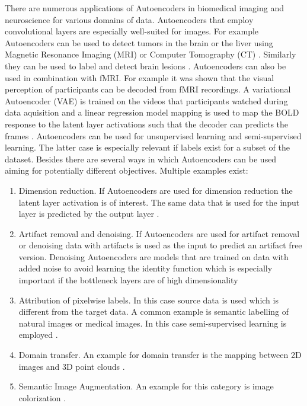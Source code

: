  There are numerous applications of Autoencoders in biomedical imaging and neuroscience for various domains of data. Autoencoders that employ convolutional layers are especially well-suited for images. For example Autoencoders can be used to detect tumors in the brain or the liver using Magnetic Resonance Imaging (MRI) or Computer Tomography (CT) \parencite{mallick2019brain, sital20203d}. Similarly they can be used to label and detect brain lesions \parencite{alex2017semisupervised}. Autoencoders can also be used in combination with fMRI. For example it was shown that the visual perception of participants can be decoded from fMRI recordings. A variational Autoencoder (VAE) is trained on the videos that participants watched during data aquisition and a linear regression model mapping is used to map the BOLD response to the latent layer activations such that the decoder can predicts the frames \parencite{han2019variational}. Autoencoders can be used for unsupervised learning and semi-supervised learning. The latter case is especially relevant if labels exist for a subset of the dataset. Besides there are several ways in which Autoencoders can be used aiming for potentially different objectives. Multiple examples exist:\\
\begin{enumerate}[label={(\arabic*)}]
    \item Dimension reduction. If Autoencoders are used for dimension reduction the latent layer activation is of interest. The same data that is used for the input layer is predicted by the output layer \parencite{han2019variational}.
    \item Artifact removal and denoising. If Autoencoders are used for artifact removal or denoising data with artifacts is used as the input to predict an artifact free version. Denoising Autoencoders are models that are trained on data with added noise to avoid learning the identity function which is especially important if the bottleneck layers are of high dimensionality \parencite{paperswithcode2021denoising}
    \item Attribution of pixelwise labels. In this case source data is used which is different from the target data. A common example is semantic labelling of natural images or medical images. In this case semi-supervised learning is employed \parencite{alex2017semisupervised}.
    \item Domain transfer. An example for domain transfer is the mapping between 2D images and 3D point clouds \parencite{lin2018learning}.
    \item Semantic Image Augmentation. An example for this category is image colorization \parencite{anwar2020image}.
\end{enumerate}
